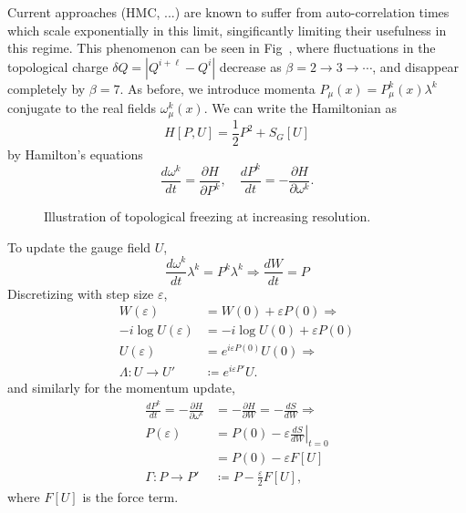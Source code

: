 \documentclass[a4paper,11pt]{article}
\begin{document}
%
Current approaches (HMC, ...) are known to suffer from auto-correlation times which scale exponentially in this limit, singificantly limiting their usefulness in this regime.
%
This phenomenon can be seen in Fig~, where fluctuations in the topological charge $\delta Q = |Q^{i + \ell} - Q^{i}|$ decrease as $\beta = 2 \rightarrow 3 \rightarrow \cdots$, and disappear completely by $\beta = 7$.
%
As before, we introduce momenta $P_{\mu}(x) = P^{k}_{\mu}(x) \lambda^{k}$ conjugate to the real fields $\omega_{\mu}^{k}(x)$.
%
We can write the Hamiltonian as
%
\begin{equation}
    H[P, U] = \frac{1}{2} P^{2} + S_{G}[U]
\end{equation}
%
by Hamilton's equations
%
\begin{equation}
\frac{d\omega^{k}}{dt} = \frac{\partial H}{\partial P^{k}},
\quad \frac{dP^{k}}{dt} = - \frac{\partial H}{\partial \omega^{k}}.
\end{equation}
%

\begin{figure}
  \begin{center}
  
  \end{center}
    \caption{\label{fig:csd}Illustration of topological freezing at increasing resolution.}
\end{figure}
%
To update the gauge field $U$,
%
\begin{equation}
    \frac{d\omega^{k}}{dt}\lambda^{k} = P^{k} \lambda^{k} \Rightarrow \frac{dW}{dt} = P
\end{equation}
%
Discretizing with step size $\varepsilon$,
%
\begin{align}
    W(\varepsilon) &= W(0) + \varepsilon P(0) \Rightarrow \\
    -i \log U(\varepsilon) &= - i \log U(0) + \varepsilon P(0) \\
    U(\varepsilon) &= e^{i \varepsilon P(0)} U(0) \Longrightarrow \\
    \Lambda: U \rightarrow U' &\coloneqq e^{i\varepsilon P'} U.
\end{align}
%
and similarly for the momentum update,
%
\begin{align}
    \frac{dP^{k}}{dt} = - \frac{\partial H}{\partial \omega^{k}} &= - \frac{\partial H}{\partial W} = - \frac{dS}{dW} \Rightarrow \\
    P(\varepsilon) &= P(0) - \varepsilon \left.\frac{dS}{dW}\right|_{t=0} \\
    &= P(0) - \varepsilon F[U] \\
    \Gamma: P \rightarrow P' &\coloneqq P - \frac{\varepsilon}{2} F[U],
\end{align}
%
where $F[U]$ is the force term.
%
\end{document}
